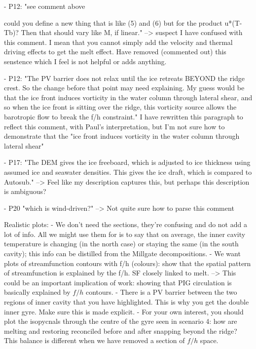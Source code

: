 - P12: "see comment above

could you define a new thing that is like (5) and (6) but for the product u*(T-Tb)?  Then that should vary like M, if linear." --> suspect I have confused with this comment. I mean that you cannot simply add the velocity and thermal driving effects to get the melt effect. Have removed (commented out) this senstence which I feel is not helpful or adds anything.

- P12: "The PV barrier does not relax until the ice retreats BEYOND the ridge crest. So the change before that point may need explaining.  My guess would be that the ice front induces vorticity in the water column through lateral shear, and so when the ice front is sitting over the ridge, this vorticity source allows the barotropic flow to break the f/h constraint."
I have rewritten this paragraph to reflect this comment, with Paul's interpretation, but I'm not sure how to demonstrate that the "ice front induces vorticity in the water column through lateral shear"

- P17: "The DEM gives the ice freeboard, which is adjusted to ice thickness using assumed ice and seawater densities.  This gives the ice draft, which is compared to Autosub." 
--> Feel like my description captures this, but perhaps this description is ambiguous?

- P20 "which is wind-driven?" 
--> Not quite sure how to parse this comment





Realistic plots:
    - We don't need the sections, they're confusing and do not add a lot of info. All we might use them for is to say that on average, the inner cavity temperature is changing (in the north case) or staying the same (in the south cavity); this info can be distilled from the Millgate decompositions.
    - We want plots of streamfunction contours with f/h (colours): show that the spatial pattern of streamfunction is explained by the f/h. SF closely linked to melt.
        --> This could be an important implication of work: showing that PIG circulation is basically explained by $f/h$ contours. 
    - There is a PV barrier between the two regions of inner cavity that you have highlighted. This is why you get the double inner gyre. Make sure this is made explicit. 
    - For your own interest, you should plot the isopycnals through the centre of the gyre seen in scenario 4: how are melting and restoring reconciled before and after snapping beyond the ridge? This balance is different when we have removed a section of $f/h$ space.
    
